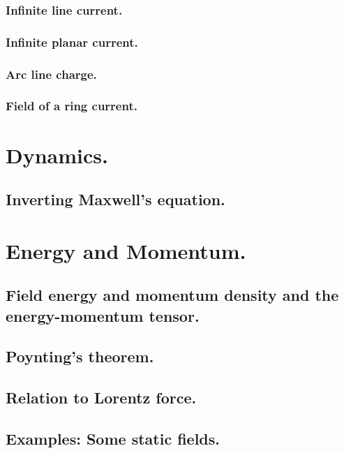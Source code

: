          \subsubsection{Infinite line current.}
            
         \subsubsection{Infinite planar current.}
            
         \subsubsection{Arc line charge.}
            
         \subsubsection{Field of a ring current.}
            
      \section{Dynamics.}
         \subsection{Inverting Maxwell's equation.}
            
      \section{Energy and Momentum.}
         \subsection{Field energy and momentum density and the energy-momentum tensor.}
            
         \subsection{Poynting's theorem.}
            
         \subsection{Relation to Lorentz force.}
            
         \subsection{Examples: Some static fields.}
            
